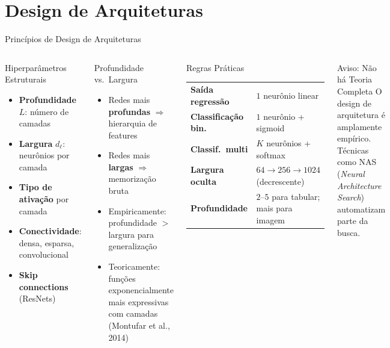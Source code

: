 \documentclass[7pt, aspectratio=169,10pt]{beamer}
\begin{document}
\section{Design de Arquiteturas}

\begin{frame}{Princípios de Design de Arquiteturas}
\begin{columns}[T]
\begin{block}{Hiperparâmetros Estruturais}
\small
\begin{itemize}
  \item \textbf{Profundidade} $L$: número de camadas
  \item \textbf{Largura} $d_\ell$: neurônios por camada
  \item \textbf{Tipo de ativação} por camada
  \item \textbf{Conectividade}: densa, esparsa, convolucional
  \item \textbf{Skip connections} (ResNets)
\end{itemize}
\end{block}
\begin{block}{Profundidade vs.\ Largura}
\small
\begin{itemize}
  \item Redes mais \textbf{profundas} $\Rightarrow$ hierarquia de features
  \item Redes mais \textbf{largas} $\Rightarrow$ memorização bruta
  \item Empiricamente: profundidade $>$ largura para generalização
  \item Teoricamente: funções exponencialmente mais expressivas com camadas (Montufar et al., 2014)
\end{itemize}
\end{block}
\begin{block}{Regras Práticas}
\small
\begin{tabular}{lp{3.4cm}}
\textbf{Saída regressão} & $1$ neurônio linear \\
\textbf{Classificação bin.} & $1$ neurônio + sigmoid \\
\textbf{Classif.\ multi} & $K$ neurônios + softmax \\
\textbf{Largura oculta} & $64 \to 256 \to 1024$ (decrescente) \\
\textbf{Profundidade} & $2$--$5$ para tabular; mais para imagem \\
\end{tabular}
\end{block}
\begin{alertblock}{Aviso: Não há Teoria Completa}
\small
O design de arquitetura é amplamente empírico. Técnicas como NAS (\textit{Neural Architecture Search}) automatizam parte da busca.
\end{alertblock}
\end{columns}
\end{frame}
\end{document}

